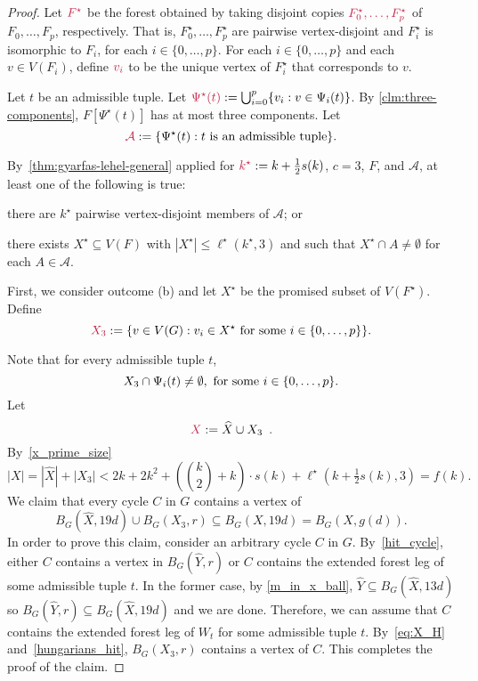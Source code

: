 \documentclass{patmorin}
\DeclarePairedDelimiter\set{\{}{\}}
\begin{document}
\begin{proof}
Let $\mathdefin{F^{\star}}$ be the forest obtained by taking 
disjoint copies $\mathdefin{F_0^\star,\ldots, F_p^\star}$ of $F_0,\ldots, F_p$, respectively.  That is,  $F_0^\star,\ldots, F_p^\star$ are pairwise vertex-disjoint and $F_i^\star$ is isomorphic to $F_i$, for each $i\in\{0,\ldots,p\}$.
For each $i\in\{0,\ldots,p\}$ and each $v\in V(F_i)$, define $\mathdefin{v_i}$ to be the unique vertex of $F^\star_i$ that corresponds to $v$.

Let $t$ be an admissible tuple. 
Let $\mathdefin{\Psi^\star(t)}:=\bigcup_{i=0}^p \{v_i:v\in \Psi_i(t)\}$.
By \cref{clm:three-components}, $F[\Psi^\star(t)]$ has at most three components. 
Let
\[
\mathdefin{\mathcal{A}}:=\{\Psi^\star(t):\text{$t$ is an admissible tuple}\}.
\]

By~\cref{thm:gyarfas-lehel-general} applied for
$\mathdefin{k^\star}:=k+\tfrac{1}{2}s(k)$, $c=3$, $F$, and $\mathcal{A}$, at least one of the following is true:
\begin{enumerate*}[label=(\alph*),ref=\alph*]
  \item there are $k^\star$ pairwise vertex-disjoint members of $\mathcal{A}$; or 
  \item there exists $X^\star\subseteq V(F)$ with $|X^\star|\leq \ell^\star(k^\star,3)$ and such that $X^\star \cap A\neq\emptyset$ for each $A\in \mathcal{A}$.
\end{enumerate*}

First, we consider outcome (b) and let $X^\star$ be the promised subset of $V(F^\star)$.
Define 
\[
\mathdefin{X_3}:=\set{v\in V(G):v_i\in X^\star \textrm{ for some $i\in\set{0,\ldots,p}$}}.
\]


Note that 
for every admissible tuple $t$,
\begin{equation}\label{eq:X_H}
X_3 \cap \Psi_i(t) \neq\emptyset,\ \textrm{for some $i\in\set{0,\ldots,p}$.}
\end{equation}
Let
\[
\mathdefin{X}:=\widehat{X} \cup X_3 \enspace .
\]
By~\eqref{x_prime_size}
\[
|X| = |\widehat{X}| + |X_3| < \textstyle 2k + 2k^2 + (\binom{k}{2}+k)\cdot s(k) +  \ell^\star(k+\tfrac{1}{2}s(k),3) = f(k).
\]
We claim that every cycle $C$ in $G$ contains a vertex of 
\[
B_G(\widehat{X},19d)\cup B_G(X_3,r)\subseteq B_G(X,19d) = B_G(X,g(d)).
\]
In order to prove this claim, consider an arbitrary cycle $C$ in $G$. 
By~\cref{hit_cycle}, either $C$ contains a vertex in $B_G(\widehat{Y},r)$ or $C$ contains the extended forest leg of some admissible tuple $t$. 
In the former case, by \eqref{m_in_x_ball}, $\widehat{Y}\subseteq B_G(\widehat{X},13d)$ so $B_G(\widehat{Y},r)\subseteq B_G(\widehat{X},19d)$  and we are done. 
Therefore, we can assume that $C$ contains the extended forest leg of $W_t$ for some admissible tuple $t$. 
By~\eqref{eq:X_H} and~\cref{hungarians_hit}, 
$B_G(X_3,r)$ contains a vertex of $C$.
This completes the proof of the claim.


\end{proof}
\end{document}
